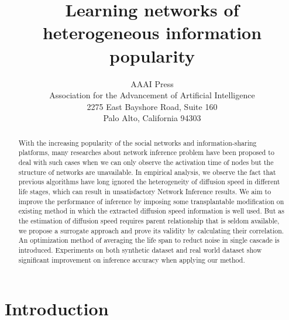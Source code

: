 \documentclass[letterpaper]{article}
\begin{document}
%

\newcommand{\xhedit}[1]{{\color{blue} #1}}
\newcommand{\xhcomment}[1]{\xhedit{[XH: #1]}}

\newcommand{\ISM}{A}
\newcommand{\IS}{\alpha}

\newcommand{\DS}{P}

\newcommand{\NActNodes}{N}


\title{Learning networks of heterogeneous information popularity}
\author{AAAI Press\\
Association for the Advancement of Artificial Intelligence\\
2275 East Bayshore Road, Suite 160\\
Palo Alto, California 94303\\
}
\maketitle
\begin{abstract}
\quad With the increasing popularity of the social networks and information-sharing platforms, many researches about network inference problem have been proposed to deal with such cases when we can only observe the activation time of nodes but the structure of networks are unavailable. In empirical analysis, we observe the fact that previous algorithms have long ignored the heterogeneity of diffusion speed in different life stages, which can result in unsatisfactory Network Inference results. We aim to improve the performance of inference by imposing some transplantable modification on existing method in which the extracted diffusion speed information is well used. But as the estimation of diffusion speed requires parent relationship that is seldom available, we propose a surrogate approach and prove its validity by calculating their correlation. An optimization method of averaging the life span to reduct noise in single cascade is introduced. Experiments on both synthetic dataset and real world dataset show significant improvement on inference accuracy when applying our method.

\end{abstract}
\section{Introduction}

\end{document}
